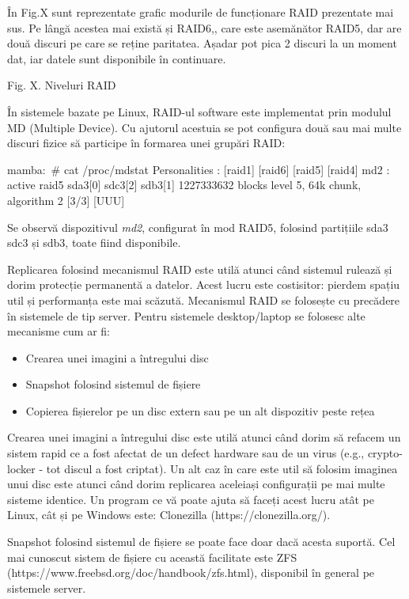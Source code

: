 În Fig.X sunt reprezentate grafic modurile de funcționare RAID prezentate mai
sus. Pe lângă acestea mai există și RAID6,, care este asemănător RAID5, dar are
două discuri pe care se reține paritatea. Așadar pot pica 2 discuri la un moment
dat, iar datele sunt disponibile în continuare.

Fig. X. Niveluri RAID

În sistemele bazate pe Linux, RAID-ul software este implementat prin modulul MD
(Multiple Device). Cu ajutorul acestuia se pot configura două sau mai multe
discuri fizice să participe în formarea unei grupări RAID:

\begin{screen}
mamba:~# cat /proc/mdstat
Personalities : [raid1] [raid6] [raid5] [raid4]
md2 : active raid5 sda3[0] sdc3[2] sdb3[1]
      1227333632 blocks level 5, 64k chunk, algorithm 2 [3/3] [UUU]
\end{screen}


Se observă dispozitivul \textit{md2}, configurat în mod RAID5, folosind
partițiile sda3 sdc3 și sdb3, toate fiind disponibile.

Replicarea folosind mecanismul RAID este utilă atunci când sistemul rulează și
dorim protecție permanentă a datelor. Acest lucru este costisitor: pierdem
spațiu util și performanța este mai scăzută. Mecanismul RAID se folosește cu
precădere în sistemele de tip server. Pentru sistemele desktop/laptop se
folosesc alte mecanisme cum ar fi:

\begin{itemize}
	\item Crearea unei imagini a întregului disc
	\item Snapshot folosind sistemul de fișiere
	\item Copierea fișierelor pe un disc extern sau pe un alt dispozitiv
		peste rețea
\end{itemize}

Crearea unei imagini a întregului disc este utilă atunci când dorim să refacem
un sistem rapid ce a fost afectat de un defect hardware sau de un virus (e.g.,
crypto-locker - tot discul a fost criptat). Un alt caz în care este util să
folosim imaginea unui disc este atunci când dorim replicarea aceleiași
configurații pe mai multe sisteme identice. Un program ce vă poate ajuta să
faceți acest lucru atât pe Linux, cât și pe Windows este: Clonezilla
(https://clonezilla.org/).

Snapshot folosind sistemul de fișiere se poate face doar dacă acesta suportă.
Cel mai cunoscut sistem de fișiere cu această facilitate este ZFS
(https://www.freebsd.org/doc/handbook/zfs.html), disponibil în general pe
sistemele server.

